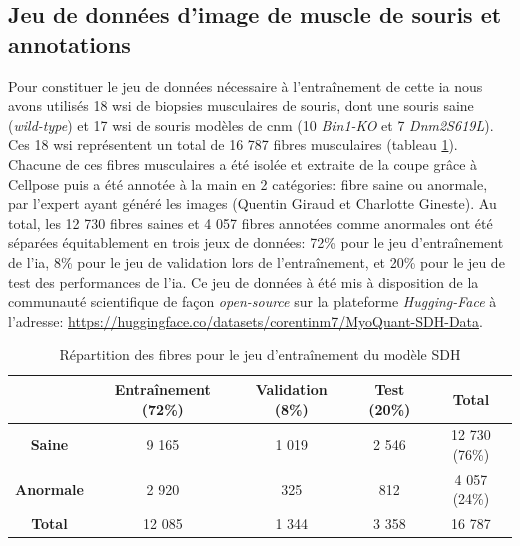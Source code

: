 \subsection{Jeu de données d'image de muscle de souris et annotations}
Pour constituer le jeu de données nécessaire à l'entraînement de cette \gls{ia} nous avons utilisés 18 \gls{wsi} de biopsies musculaires de souris, dont une souris saine (\textit{wild-type}) et 17 \gls{wsi} de souris modèles de \gls{cnm} (10 \textit{Bin1-KO} et 7 \textit{Dnm2S619L}). Ces 18 \gls{wsi} représentent un total de 16 787 fibres musculaires (tableau \ref{tab:sdh_fiber_count}). Chacune de ces fibres musculaires a été isolée et extraite de la coupe grâce à Cellpose puis a été annotée à la main en 2 catégories: fibre saine ou anormale, par l'expert ayant généré les images (Quentin Giraud et Charlotte Gineste). Au total, les 12 730 fibres saines et 4 057 fibres annotées comme anormales ont été séparées équitablement en trois jeux de données: 72\% pour le jeu d'entraînement de l'\gls{ia}, 8\% pour le jeu de validation lors de l'entraînement, et 20\% pour le jeu de test des performances de l'\gls{ia}. Ce jeu de données à été mis à disposition de la communauté scientifique de façon \textit{open-source} sur la plateforme \textit{Hugging-Face} à l'adresse: \href{https://huggingface.co/datasets/corentinm7/MyoQuant-SDH-Data}{https://huggingface.co/datasets/corentinm7/MyoQuant-SDH-Data}.

\begin{table}[htbp]
\centering
\caption{Répartition des fibres pour le jeu d'entraînement du modèle SDH}
\label{tab:sdh_fiber_count}
\begin{tabular}{|c|c|c|c|c|}
\hline
 & \textbf{Entraînement} (72\%) & \textbf{Validation} (8\%) & \textbf{Test} (20\%) & \textbf{Total} \\
\hline
\textbf{Saine} & 9 165 & 1 019 & 2 546 & 12 730 (76\%) \\
\hline
\textbf{Anormale} & 2 920 & 325 & 812 & 4 057 (24\%) \\
\hline
\hline
\textbf{Total} & 12 085 & 1 344 & 3 358 & 16 787 \\
\hline
\end{tabular}
\end{table}


